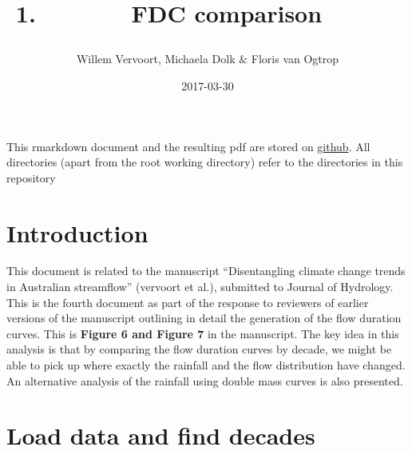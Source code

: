 \documentclass[]{article}
\title{\begin{enumerate}
\def\labelenumi{\arabic{enumi}.}
\setcounter{enumi}{3}
\tightlist
\item
  FDC comparison
\end{enumerate}}
\author{Willem Vervoort, Michaela Dolk \& Floris van Ogtrop}
\date{2017-03-30}
\newenvironment{Shaded}{\begin{snugshade}}{\end{snugshade}}
\newcommand{\KeywordTok}[1]{\textcolor[rgb]{0.13,0.29,0.53}{\textbf{{#1}}}}
\newcommand{\DataTypeTok}[1]{\textcolor[rgb]{0.13,0.29,0.53}{{#1}}}
\newcommand{\StringTok}[1]{\textcolor[rgb]{0.31,0.60,0.02}{{#1}}}
\newcommand{\CommentTok}[1]{\textcolor[rgb]{0.56,0.35,0.01}{\textit{{#1}}}}
\newcommand{\OtherTok}[1]{\textcolor[rgb]{0.56,0.35,0.01}{{#1}}}
\newcommand{\NormalTok}[1]{{#1}}
\begin{document}
\maketitle

\begin{Shaded}
\end{Shaded}

This rmarkdown document and the resulting pdf are stored on
\href{https://github.com/WillemVervoort/VirtExp}{github}. All
directories (apart from the root working directory) refer to the
directories in this repository

\section{Introduction}\label{introduction}

This document is related to the manuscript ``Disentangling climate
change trends in Australian streamflow'' (vervoort et al.), submitted to
Journal of Hydrology. This is the fourth document as part of the
response to reviewers of earlier versions of the manuscript outlining in
detail the generation of the flow duration curves. This is
\textbf{Figure 6 and Figure 7} in the manuscript. The key idea in this
analysis is that by comparing the flow duration curves by decade, we
might be able to pick up where exactly the rainfall and the flow
distribution have changed. An alternative analysis of the rainfall using
double mass curves is also presented.

\section{Load data and find decades}\label{load-data-and-find-decades}
\end{document}
